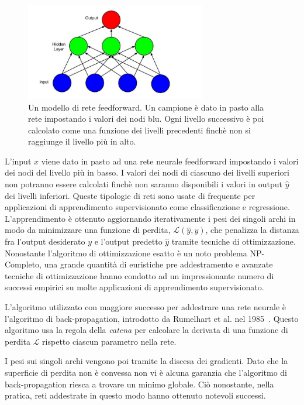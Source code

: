 \begin{figure}[tp]
  \centering
  \begin{center}
    \includegraphics[width=0.7\textwidth]{./images/feedForwardNeuralNetwork.png}
  \end{center}
  \caption{Un modello di rete feedforward.
  Un campione \`e dato in pasto alla rete impostando i valori dei nodi blu.
  Ogni livello successivo \`e poi calcolato come una funzione dei livelli
  precedenti finch\`e non si raggiunge il livello pi\`u in alto.}
  \label{fig:feedforwardNeuralNetwork}
\end{figure}

L'input $x$ viene dato in pasto ad una rete neurale feedforward impostando i
valori dei nodi del livello pi\`u in basso. I valori dei nodi di ciascuno dei
livelli superiori non potranno essere calcolati finch\`e non saranno disponibili
i valori in output $\hat{y}$ dei livelli inferiori. Queste tipologie di reti sono
usate di frequente per applicazioni di apprendimento supervisionato come
classificazione e regressione. L'apprendimento \`e ottenuto aggiornando
iterativamente i pesi dei singoli archi in modo da minimizzare una funzione di
perdita, $\mathcal{L}(\hat{y},y)$, che penalizza la distanza fra l'output desiderato
$y$ e l'output predetto $\hat{y}$ tramite tecniche di ottimizzazione. Nonostante
l'algoritmo di ottimizzazione esatto \`e un noto problema NP-Completo, una grande
quantit\`a di euristiche pre addestramento e avanzate tecniche di ottimizzazione
hanno condotto ad un impressionante numero di successi empirici su molte applicazioni
di apprendimento supervisionato.

L'algoritmo utilizzato con maggiore successo per addestrare una rete neurale \`e
l'algoritmo di back-propagation, introdotto da Rumelhart et al. nel 1985~\cite{Rumelhart:1985}.
Questo algoritmo usa la regola della \emph{catena} per calcolare la derivata di
una funzione di perdita $\mathcal{L}$ rispetto ciascun parametro nella rete.

I pesi sui singoli archi vengono poi tramite la discesa dei gradienti. Dato che
la superficie di perdita non \`e convessa non vi \`e alcuna garanzia che l'algoritmo
di back-propagation riesca a trovare un minimo globale. Ci\`o nonostante, nella
pratica, reti addestrate in questo modo hanno ottenuto notevoli successi.

